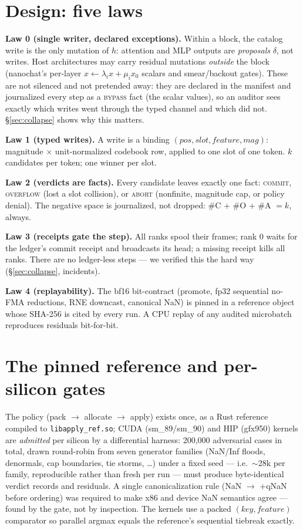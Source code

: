 \documentclass[10pt,twocolumn]{article}
\begin{document}
\section{Design: five laws}
\label{sec:design}

\textbf{Law 0 (single writer, declared exceptions).} Within a block, the
catalog write is the only mutation of $h$: attention and MLP outputs are
\emph{proposals} $\delta$, not writes. Host architectures may carry
residual mutations \emph{outside} the block (nanochat's per-layer
$x \leftarrow \lambda_i x + \mu_i x_0$ scalars and smear/backout gates).
These are not silenced and not pretended away: they are declared in the
manifest and journalized every step as a \textsc{bypass} fact (the scalar
values), so an auditor sees exactly which writes went through the typed
channel and which did not. \S\ref{sec:collapse} shows why this matters.

\textbf{Law 1 (typed writes).} A write is a binding $(pos, slot, feature,
mag)$: magnitude $\times$ unit-normalized codebook row, applied to one slot
of one token. $k$ candidates per token; one winner per slot.

\textbf{Law 2 (verdicts are facts).} Every candidate leaves exactly one
fact: \textsc{commit}, \textsc{overflow} (lost a slot collision), or
\textsc{abort} (nonfinite, magnitude cap, or policy denial). The negative
space is journalized, not dropped: \#C + \#O + \#A $= k$, always.

\textbf{Law 3 (receipts gate the step).} All ranks spool their frames; rank
0 waits for the ledger's commit receipt and broadcasts its head; a missing
receipt kills all ranks. There are no ledger-less steps --- we verified this
the hard way (\S\ref{sec:collapse}, incidents).

\textbf{Law 4 (replayability).} The bf16 bit-contract (promote, fp32
sequential no-FMA reductions, RNE downcast, canonical NaN) is pinned in a
reference object whose SHA-256 is cited by every run. A CPU replay of any
audited microbatch reproduces residuals bit-for-bit.

\section{The pinned reference and per-silicon gates}
\label{sec:gates}

The policy (pack $\to$ allocate $\to$ apply) exists once, as a Rust
reference compiled to \texttt{libapply\_ref.so}; CUDA (sm\_89/sm\_90) and
HIP (gfx950) kernels are \emph{admitted} per silicon by a differential
harness: 200{,}000 adversarial cases in total, drawn round-robin from seven
generator families (NaN/Inf floods, denormals, cap boundaries, tie storms,
\ldots) under a fixed seed --- i.e.\ $\sim$28k per family, reproducible
rather than fresh per run --- must produce byte-identical verdict records
and residuals. A single canonicalization rule (NaN $\to$ +qNaN before ordering)
was required to make x86 and device NaN semantics agree --- found by the
gate, not by inspection. The kernels use a packed $(key, feature)$
comparator so parallel argmax equals the reference's sequential tiebreak
exactly.
\end{document}
